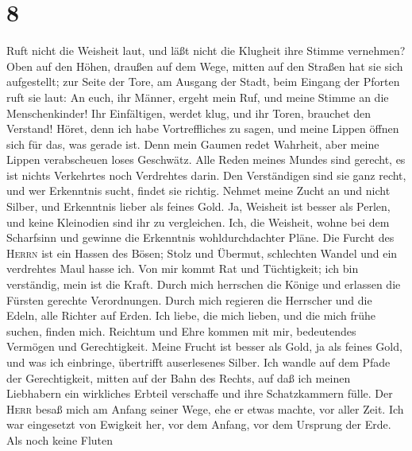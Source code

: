 \hypertarget{section-7}{%
\section{8}\label{section-7}}

 Ruft nicht die Weisheit laut, und läßt nicht die Klugheit
ihre Stimme vernehmen?  Oben auf den Höhen, draußen auf
dem Wege, mitten auf den Straßen hat sie sich aufgestellt;
 zur Seite der Tore, am Ausgang der Stadt, beim Eingang
der Pforten ruft sie laut:  An euch, ihr Männer, ergeht
mein Ruf, und meine Stimme an die Menschenkinder!  Ihr
Einfältigen, werdet klug, und ihr Toren, brauchet den Verstand!
 Höret, denn ich habe Vortreffliches zu sagen, und meine
Lippen öffnen sich für das, was gerade ist.  Denn mein
Gaumen redet Wahrheit, aber meine Lippen verabscheuen loses Geschwätz.
 Alle Reden meines Mundes sind gerecht, es ist nichts
Verkehrtes noch Verdrehtes darin.  Den Verständigen sind
sie ganz recht, und wer Erkenntnis sucht, findet sie richtig.
 Nehmet meine Zucht an und nicht Silber, und Erkenntnis
lieber als feines Gold.  Ja, Weisheit ist besser als
Perlen, und keine Kleinodien sind ihr zu vergleichen. 
Ich, die Weisheit, wohne bei dem Scharfsinn und gewinne die Erkenntnis
wohldurchdachter Pläne.  Die Furcht des \textsc{Herrn}
ist ein Hassen des Bösen; Stolz und Übermut, schlechten Wandel und ein
verdrehtes Maul hasse ich.  Von mir kommt Rat und
Tüchtigkeit; ich bin verständig, mein ist die Kraft. 
Durch mich herrschen die Könige und erlassen die Fürsten gerechte
Verordnungen.  Durch mich regieren die Herrscher und die
Edeln, alle Richter auf Erden.  Ich liebe, die mich
lieben, und die mich frühe suchen, finden mich.  Reichtum
und Ehre kommen mit mir, bedeutendes Vermögen und Gerechtigkeit.
 Meine Frucht ist besser als Gold, ja als feines Gold,
und was ich einbringe, übertrifft auserlesenes Silber. 
Ich wandle auf dem Pfade der Gerechtigkeit, mitten auf der Bahn des
Rechts,  auf daß ich meinen Liebhabern ein wirkliches
Erbteil verschaffe und ihre Schatzkammern fülle.  Der
\textsc{Herr} besaß mich am Anfang seiner Wege, ehe er etwas machte, vor
aller Zeit.  Ich war eingesetzt von Ewigkeit her, vor dem
Anfang, vor dem Ursprung der Erde.  Als noch keine Fluten
